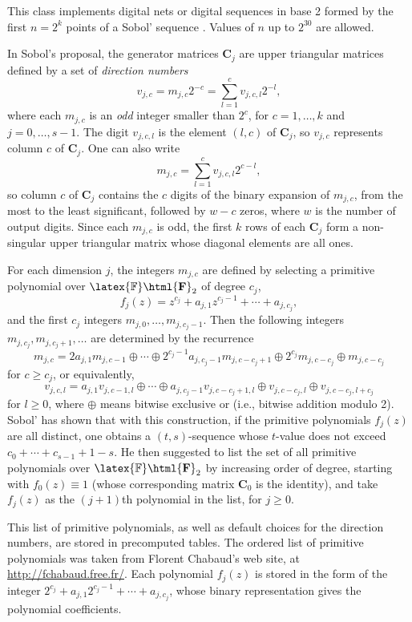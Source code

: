 
This class implements digital nets or digital sequences in base 2 formed by
 the first $n = 2^k$ points of a Sobol' sequence \cite{rSOB67a,rSOB76b}.
Values of $n$ up to $2^{30}$ are allowed. %

In Sobol's proposal, the generator matrices $\mathbf{C}_j$ are upper triangular 
matrices defined by a set of \emph{direction numbers} 
\[
  v_{j,c} = m_{j,c} 2^{-c} = \sum_{l=1}^c v_{j,c,l} 2^{-l},
\]
where each $m_{j,c}$ is an \emph{odd} integer smaller than $2^c$, 
for $c=1,\dots,k$ and $j=0,\dots,s-1$.
The digit $v_{j,c,l}$ is the element $(l,c)$ of $\mathbf{C}_j$,
so $v_{j,c}$ represents column $c$ of $\mathbf{C}_j$.
One can also write
\[
  m_{j,c} = \sum_{l=1}^c v_{j,c,l} 2^{c-l},
\]
so column $c$ of $\mathbf{C}_j$ contains the $c$ digits of the binary expansion
of $m_{j,c}$, from the most to the least significant, 
followed by $w-c$ zeros, where $w$ is the number of output digits.
Since each $m_{j,c}$ is odd, the first $k$ rows of each $\mathbf{C}_j$ form
a non-singular upper triangular matrix whose diagonal elements 
are all ones.

For each dimension $j$, the integers $m_{j,c}$ are defined by
selecting a primitive polynomial over
 $\latex{\mathbb{F}}\html{\mathbf{F}}_2$ of degree $c_j$,
\[
  f_j(z) = z^{c_j} + a_{j,1}z^{c_j-1} + \cdots + a_{j,c_j},
\]
and the first $c_j$ integers $m_{j,0},\dots,m_{j,c_j-1}$.
Then the following integers $m_{j,c_j}, m_{j, c_j+1}, \dots$ are
determined by the recurrence
\[
  m_{j,c} = 2 a_{j,1} m_{j,c-1} 
    \oplus\cdots\oplus 2^{c_j-1} a_{j,c_j-1}m_{j,c-c_j+1}
    \oplus 2^{c_j} m_{j,c-c_j}\oplus m_{j,c-c_j}
\]
for $c\ge c_j$, or equivalently,
$$
  v_{j,c,l} = a_{j,1} v_{j,c-1,l} 
    \oplus\cdots\oplus a_{j,c_j-1} v_{j,c-c_j+1,l}
    \oplus v_{j,c-c_j,l}\oplus v_{j,c-c_j,l+c_j}
$$
for $l\ge 0$, where $\oplus$ means bitwise exclusive or
(i.e., bitwise addition modulo 2).
Sobol' has shown \cite{rSOB67a} that with this construction, if the 
primitive polynomials $f_j(z)$ are all distinct, one obtains
a $(t,s)$-sequence whose $t$-value does not exceed
$c_0 + \cdots + c_{s-1} + 1 - s$.
He then suggested to list the set of all primitive polynomials over
$\latex{\mathbb{F}}\html{\mathbf{F}}_2$ by increasing order of degree, starting with $f_0(z) \equiv 1$
(whose corresponding matrix $\mathbf{C}_0$ is the identity), and take $f_j(z)$
as the $(j+1)$th polynomial in the list, for $j\ge 0$.

This list of primitive polynomials, as well as default choices
for the direction numbers, are stored in precomputed tables.
The ordered list of primitive polynomials  was taken from Florent Chabaud's web site, 
at \url{http://fchabaud.free.fr/}.
Each polynomial $f_j(z)$ is stored in the form of the integer
$2^{c_j} + a_{j,1}2^{c_j-1} + \cdots + a_{j,c_j}$, whose binary 
representation gives the polynomial coefficients.

